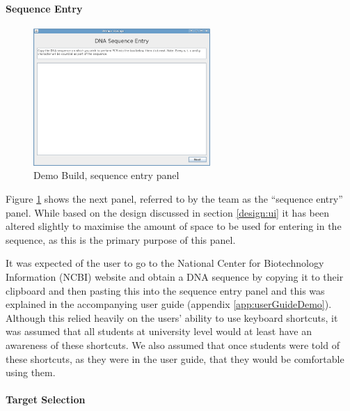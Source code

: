 \paragraph{Sequence Entry}

\begin{figure}[h]
  \begin{center}
    \includegraphics[width=0.6\textwidth]{./images/demoBuild/sequenceEntry.png}
    \caption{
      \label{fig:demoBuild:sequenceEntry}
      Demo Build, sequence entry panel 
    }
  \end{center}
\end{figure}

Figure \ref{fig:demoBuild:sequenceEntry} shows the next panel,
referred to by the team as the ``sequence entry'' panel.
While based on the design discussed in section \ref{design:ui} it
has been altered slightly to maximise the amount of space to be used
for entering in the sequence, as this is the primary purpose of this
panel.

It was expected of the user to go to the National Center for
Biotechnology Information (NCBI) website and obtain a DNA sequence by
copying it to their clipboard and then pasting this into the sequence
entry panel and this was explained in the accompanying user guide
(appendix \ref{app:userGuideDemo}).
Although this relied heavily on the users' ability to use keyboard
shortcuts, it was assumed that all students at university level would
at least have an awareness of these shortcuts.
We also assumed that once students were told of these shortcuts, as
they were in the user guide, that they would be comfortable using
them.


\paragraph{Target Selection}

